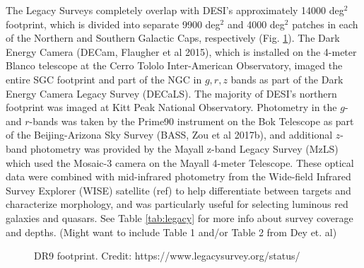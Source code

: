 The Legacy Surveys completely overlap with DESI's approximately 14000 deg$^2$ footprint, which is divided into separate 9900 deg$^2$ and 4000 deg$^2$ patches in each of the Northern and Southern Galactic Caps, respectively (Fig. \ref{fig:footprint}). The Dark Energy Camera (DECam, Flaugher et al 2015), which is installed on the 4-meter Blanco telescope at the Cerro Tololo Inter-American Observatory, imaged the entire SGC footprint and part of the NGC in $g,r,z$ bands as part of the Dark Energy Camera Legacy Survey (DECaLS). The majority of DESI's northern footprint was imaged at Kitt Peak National Observatory. Photometry in the $g$- and $r$-bands was taken by the Prime90 instrument on the Bok Telescope as part of the Beijing-Arizona Sky Survey (BASS, Zou et al 2017b), and additional $z$-band photometry was provided by the Mayall z-band Legacy Survey (MzLS) which used the Mosaic-3 camera on the Mayall 4-meter Telescope. These optical data were combined with mid-infrared photometry from the Wide-field Infrared Survey Explorer (WISE) satellite (ref) to help differentiate between targets and characterize morphology, and was particularly useful for selecting luminous red galaxies and quasars. See Table \ref{tab:legacy} for more info about survey coverage and depths. (Might want to include Table 1 and/or Table 2 from Dey et. al)

\begin{figure}\centering
{}\hfill
{}\par 
{}
\caption{DR9 footprint. Credit: https://www.legacysurvey.org/status/}
\label{fig:footprint}
\end{figure}


